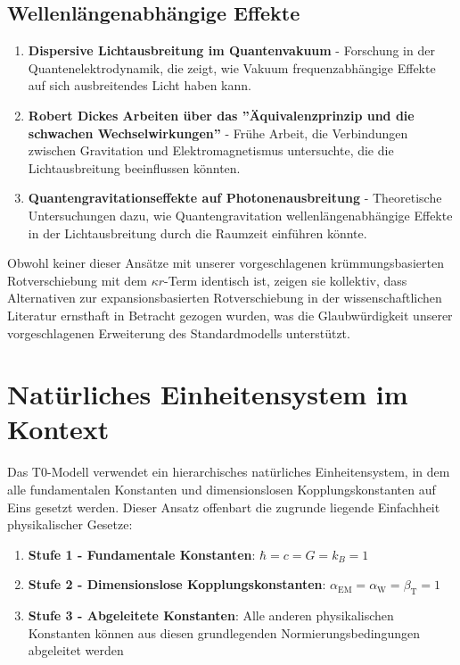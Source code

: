 \documentclass[12pt,a4paper]{article}
\newcommand{\alphaEM}{\alpha_{\text{EM}}}
\newcommand{\alphaW}{\alpha_{\text{W}}}
\newcommand{\betaT}{\beta_{\text{T}}}
\begin{document}
	\subsection{Wellenlängenabhängige Effekte}
	\label{subsec:wavelength_effects}
	
	\begin{enumerate}
		\item \textbf{Dispersive Lichtausbreitung im Quantenvakuum}\cite{drummond1980} - Forschung in der Quantenelektrodynamik, die zeigt, wie Vakuum frequenzabhängige Effekte auf sich ausbreitendes Licht haben kann.
		
		\item \textbf{Robert Dickes Arbeiten über das ''Äquivalenzprinzip und die schwachen Wechselwirkungen''}\cite{dicke1957} - Frühe Arbeit, die Verbindungen zwischen Gravitation und Elektromagnetismus untersuchte, die die Lichtausbreitung beeinflussen könnten.
		
		\item \textbf{Quantengravitationseffekte auf Photonenausbreitung}\cite{amelino2009} - Theoretische Untersuchungen dazu, wie Quantengravitation wellenlängenabhängige Effekte in der Lichtausbreitung durch die Raumzeit einführen könnte.
	\end{enumerate}
	
	Obwohl keiner dieser Ansätze mit unserer vorgeschlagenen krümmungsbasierten Rotverschiebung mit dem $\kappa r$-Term identisch ist, zeigen sie kollektiv, dass Alternativen zur expansionsbasierten Rotverschiebung in der wissenschaftlichen Literatur ernsthaft in Betracht gezogen wurden, was die Glaubwürdigkeit unserer vorgeschlagenen Erweiterung des Standardmodells unterstützt.
	
	\section{Natürliches Einheitensystem im Kontext}
	\label{sec:natural_units_context}
	
	Das T0-Modell verwendet ein hierarchisches natürliches Einheitensystem, in dem alle fundamentalen Konstanten und dimensionslosen Kopplungskonstanten auf Eins gesetzt werden\cite{pascher_alphabeta_2025}. Dieser Ansatz offenbart die zugrunde liegende Einfachheit physikalischer Gesetze:
	
	\begin{enumerate}
		\item \textbf{Stufe 1 - Fundamentale Konstanten}: $\hbar = c = G = k_B = 1$\cite{planck1899}
		\item \textbf{Stufe 2 - Dimensionslose Kopplungskonstanten}: $\alphaEM = \alphaW = \betaT = 1$\cite{pascher_alpha_2025}
		\item \textbf{Stufe 3 - Abgeleitete Konstanten}: Alle anderen physikalischen Konstanten können aus diesen grundlegenden Normierungsbedingungen abgeleitet werden\cite{pascher_alphabeta_2025}
	\end{enumerate}
	
\end{document}
